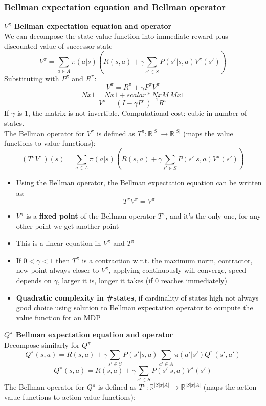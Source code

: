 \subsubsection{Bellman expectation equation and Bellman operator}
    \textbf{$V^\pi$ Bellman expectation equation and operator}\\
    We can decompose the state-value function into immediate reward plus discounted value of successor state
    $$V^\pi=\sum_{a \in A}\pi(a|s)\left(R(s,a)+\gamma\sum_{s'\in S}P(s'|s,a)V^\pi(s')\right)$$
    Substituting with $P^\pi$ and $R^\pi$:
    $$V^\pi=R^\pi+\gamma P^\pi V^\pi$$
    $$Nx1=Nx1+scalar*NxM\,Mx1$$
    $$V^\pi=(I-\gamma P^\pi)^{-1}R^\pi$$
    If $\gamma$ is 1, the matrix is not invertible. Computational cost: cubic in number of states.\\
    The Bellman operator for $V^\pi$ is defined as $T^\pi:\mathbb{R}^{|S|}\rightarrow\mathbb{R}^{|S|}$ (maps the value functions to value functions):
    $$(T^\pi V^\pi)(s)=\sum_{a \in A}\pi(a|s)\left(R(s,a)+\gamma\sum_{s'\in S}P(s'|s,a)V^\pi(s')\right)$$
    \begin{itemize}
        \item Using the Bellman operator, the Bellman expectation equation can be written as:
        $$T^\pi V^\pi=V^\pi$$
        \item $V^\pi$ is a \textbf{fixed point} of the Bellman operator $T^\pi$, and it's the only one, for any other point we get another point
        \item This is a linear equation in $V^\pi$ and $T^\pi$
        \item If $0 < \gamma < 1$ then $T^\pi$ is a contraction w.r.t. the maximum norm, contractor, new point always closer to $V^\pi$, applying continuously will converge, speed depends on $\gamma$, larger it is, longer it takes (if 0 reaches immediately)
        \item \textbf{Quadratic complexity in \#states}, if cardinality of states high not always good choice using solution to Bellman expectation operator to compute the value function for an MDP
    \end{itemize}
    \textbf{$Q^\pi$ Bellman expectation equation and operator}\\
    Decompose similarly for $Q^\pi$
    $$Q^\pi(s,a)=R(s,a)+\gamma\sum_{s' \in S}P(s'|s,a)\sum_{a' \in A}\pi(a'|s')Q^\pi(s',a')$$
    $$Q^\pi(s,a)=R(s,a)+\gamma\sum_{s' \in S}P(s'|s,a)V^\pi(s')$$
    The Bellman operator for $Q^\pi$ is defined as $T^\pi:\mathbb{R}^{|S|x|A|}\rightarrow\mathbb{R}^{|S|x|A|}$ (maps the action-value functions to action-value functions):
